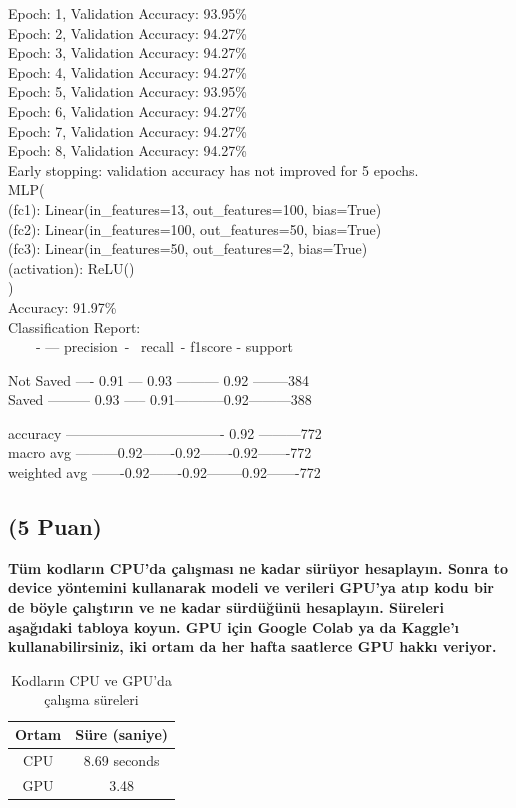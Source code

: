 \documentclass[11pt]{article}
\begin{document}
Epoch: 1, Validation Accuracy: 93.95\%\\
Epoch: 2, Validation Accuracy: 94.27\%\\
Epoch: 3, Validation Accuracy: 94.27\%\\
Epoch: 4, Validation Accuracy: 94.27\%\\
Epoch: 5, Validation Accuracy: 93.95\%\\
Epoch: 6, Validation Accuracy: 94.27\%\\
Epoch: 7, Validation Accuracy: 94.27\%\\
Epoch: 8, Validation Accuracy: 94.27\%\\
Early stopping: validation accuracy has not improved for 5 epochs.\\
MLP(\\
  (fc1): Linear(in_features=13, out_features=100, bias=True)\\
  (fc2): Linear(in_features=100, out_features=50, bias=True)\\
  (fc3): Linear(in_features=50, out_features=2, bias=True)\\
  (activation): ReLU()\\
)\\
Accuracy: 91.97\%\\
Classification Report:\\
   \  \    \ \  - ---  precision\ - \ recall\ - f1score  - support

   Not Saved    ----  0.91    ---  0.93 --------- 0.92 --------384\\
       Saved  --------- 0.93 -----  0.91-----------0.92---------388

    accuracy ---------------------------------- 0.92 ---------772\\
   macro avg ---------0.92-------0.92-------0.92-------772\\
weighted avg -------0.92-------0.92--------0.92-------772

\subsection{(5 Puan)} \textbf{Tüm kodların CPU'da çalışması ne kadar sürüyor hesaplayın. Sonra to device yöntemini kullanarak modeli ve verileri GPU'ya atıp kodu bir de böyle çalıştırın ve ne kadar sürdüğünü hesaplayın. Süreleri aşağıdaki tabloya koyun. GPU için Google Colab ya da Kaggle'ı kullanabilirsiniz, iki ortam da her hafta saatlerce GPU hakkı veriyor.}

\begin{table}[ht!]
    \centering
    \caption{Kodların CPU ve GPU'da çalışma süreleri}
    \begin{tabular}{c|c}
        Ortam & Süre (saniye) \\\hline
        CPU & 8.69 seconds \\
        GPU & 3.48\\
    \end{tabular}
    \label{tab:my_table}
\end{table}
\end{document}
